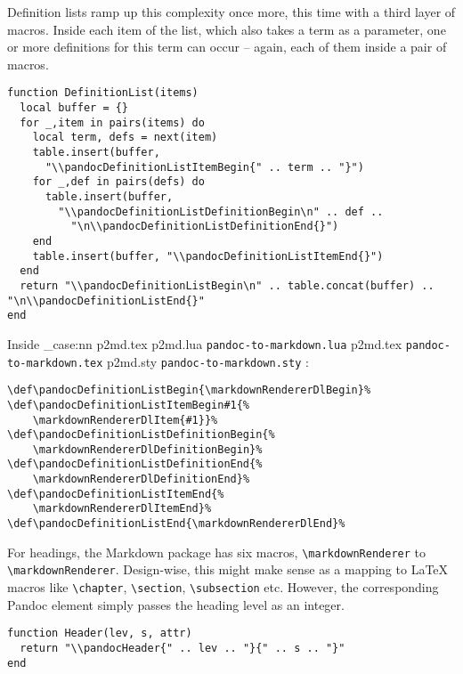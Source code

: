 \documentclass[
  digital,     %
  oneside,     %
  nosansbold,  %
  nocolorbold, %
  lof,         %
  nolot,       %
]{fithesis4}
\newcommand\macro[1]{\texttt{\textbackslash{}{#1}}}
\newcommand\renderer[1]{\macro{markdown\-Renderer\-{#1}}}
\newcommand\file[1]
  {
    \str_case:nn
      { #1 }
      {
        { p2md.lua } { \texttt{pandoc\hyp{}to\hyp{}markdown.lua} }
        { p2md.tex } { \texttt{pandoc\hyp{}to\hyp{}markdown.tex} }
        { p2md.sty } { \texttt{pandoc\hyp{}to\hyp{}markdown.sty} }
      }
  }
\begin{document}
\noindent
Definition lists ramp up this complexity once more, this time with a third layer of macros. Inside  each item of the list, which also takes a term as a parameter, one or more definitions for this term can occur -- again, each of them inside a pair of macros.

\noindent
\lstset{language=[5.3]Lua}
\begin{lstlisting}
function DefinitionList(items)
  local buffer = {}
  for _,item in pairs(items) do
    local term, defs = next(item)
    table.insert(buffer,
      "\\pandocDefinitionListItemBegin{" .. term .. "}")
    for _,def in pairs(defs) do
      table.insert(buffer,
        "\\pandocDefinitionListDefinitionBegin\n" .. def ..
          "\n\\pandocDefinitionListDefinitionEnd{}")
    end
    table.insert(buffer, "\\pandocDefinitionListItemEnd{}")
  end
  return "\\pandocDefinitionListBegin\n" .. table.concat(buffer) .. "\n\\pandocDefinitionListEnd{}"
end
\end{lstlisting}

\noindent
Inside \file{p2md.tex}:

\noindent
\lstset{language=[plain]TeX}
\begin{lstlisting}
\def\pandocDefinitionListBegin{\markdownRendererDlBegin}%
\def\pandocDefinitionListItemBegin#1{%
    \markdownRendererDlItem{#1}}%
\def\pandocDefinitionListDefinitionBegin{%
    \markdownRendererDlDefinitionBegin}%
\def\pandocDefinitionListDefinitionEnd{%
    \markdownRendererDlDefinitionEnd}%
\def\pandocDefinitionListItemEnd{%
    \markdownRendererDlItemEnd}%
\def\pandocDefinitionListEnd{\markdownRendererDlEnd}%
\end{lstlisting}

\noindent
For headings, the Markdown package has six macros, \renderer{HeadingOne} to \renderer{HeadingSix}. Design-wise, this might make sense as a mapping to \LaTeX{} macros like \macro{chapter}, \macro{section}, \macro{subsection} etc. However, the corresponding Pandoc element simply passes the heading level as an integer.

\noindent
\lstset{language=[5.3]Lua}
\begin{lstlisting}
function Header(lev, s, attr)
  return "\\pandocHeader{" .. lev .. "}{" .. s .. "}"
end
\end{lstlisting}
\end{document}
